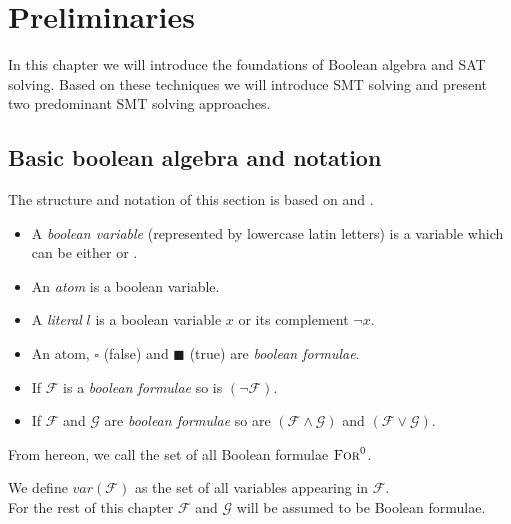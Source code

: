 \chapter{Preliminaries}
\label{ch:preliminaries}
In this chapter we will introduce the foundations of Boolean algebra and SAT solving. Based on these techniques we will introduce SMT solving and present two predominant SMT solving approaches.

\section{Basic boolean algebra and notation}
The structure and notation of this section is based on \cite{Marques-Silva-PropositionalSATSolving} and \cite{fondements-logique}.
\begin{definition}

\begin{itemize}
    \item A \textit{boolean variable} (represented by lowercase latin letters) is a variable which can be either \true or \false.
    \item An \textit{atom} is a boolean variable.
    \item A \textit{literal} $l$ is a boolean variable $x$ or its complement $\neg x$.
\end{itemize}

\end{definition}
\begin{definition}
\begin{itemize}
    \item An atom, $\square$ (false) and $\blacksquare$ (true)  are \textit{boolean formulae}.
    \item If $\mathcal{F}$ is a \textit{boolean formulae} so is $\left(\neg\mathcal{F}\right)$.
    \item If $\mathcal{F}$ and $\mathcal{G}$ are \textit{boolean formulae} so are $\left(\mathcal{F} \land \mathcal{G}\right)$ and $\left(\mathcal{F} \lor \mathcal{G}\right)$.
\end{itemize}
From hereon, we call the set of all Boolean formulae $\textsc{For}^0$.\\
\end{definition}
We define $var(\mathcal{F})$ as the set of all variables appearing in  $\mathcal{F}$.\\
For the rest of this chapter $\mathcal{F}$ and $\mathcal{G}$ will be assumed to be Boolean formulae.


